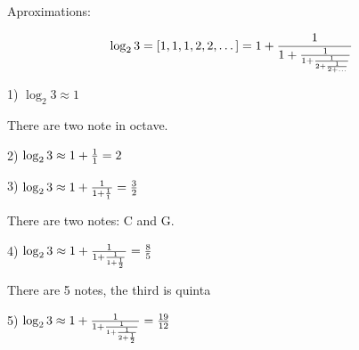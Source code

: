       Aproximations:

      $$
\log_2 3=[1,1,1,2,2,\dots]=1+{1\over 1+{1\over 1+{1\over 2+
{1\over 2+\dots}}}}
      $$
 
  1) $\log_2 3\approx 1$
  
There are two note in octave.

  2) $\log_2 3\approx 1+{1\over 1}=2$
  
  3) $\log_2 3\approx 1+{1\over 1+{1\over 1}}={3\over 2}$
  
There are two notes: C and G.


  4) $\log_2 3\approx 1+{1\over 1+{1\over 1+{1\over 2}}}=
{8\over 5}$
  
There are 5 notes, the third is quinta


 5) $\log_2 3\approx 1+{1\over 1+{1\over 1+{1\over 2+{1\over 2}}}}=
{19\over 12}$



\bye 

